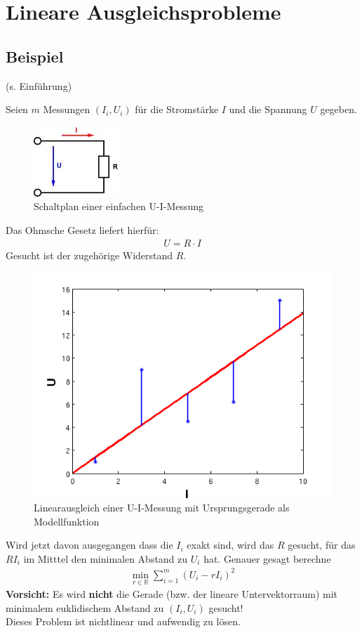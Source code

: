 \documentclass[ngerman,fontsize=11pt, paper=a4, parskip=half, titlepage=true, toc=bib]{scrbook}
\newcommand{\R}{\mathds{R}}
\newcommand{\sectione}[1]{\section{#1} \setcounter{equation}{0}}
\begin{document}
		
	\sectione{Lineare Ausgleichsprobleme} 
	
	\subsection{Beispiel}
	(s. Einführung)
	
	Seien $m$ Messungen $(I_i, U_i)$ für die Stromstärke $I$ und die Spannung $U$ gegeben. \\
	
		  \begin{figure}
		  	\parbox{\linewidth}{
		  		\centering
		  		\includegraphics{images/ohmsche.jpeg}
		  	}
		  	\caption{Schaltplan einer einfachen U-I-Messung}
		  \end{figure}
		  
		
	Das Ohmsche Gesetz liefert hierfür:
	\begin{gather*}
		U=R\cdot I
	\end{gather*}
	Gesucht ist der zugehörige Widerstand $R$.\\
	
			  \begin{figure}
			  	\parbox{\linewidth}{
			  		\centering
			  		\includegraphics[width=0.5\linewidth]{images/linausgl2.png}
			  	}
			  	\caption{Linearausgleich einer U-I-Messung mit Ursprungsgerade als Modellfunktion}
			  \end{figure}
	
	
	Wird jetzt davon ausgegangen dass die $I_i$ exakt sind, wird das $R$ gesucht, 
	für das $RI_i$ im Mitttel den minimalen Abstand zu $U_i$ hat.
	Genauer gesagt berechne
	\begin{gather*}
		\min_{r\in\R} \sum_{i=1}^{m}(U_i-rI_i)^2
	\end{gather*}
	\textbf{Vorsicht: } Es wird \textbf{nicht} die Gerade (bzw. der lineare Untervektorraum) mit 
	minimalem euklidischem Abstand zu $(I_i,U_i)$ gesucht! \\
	Dieses Problem ist nichtlinear und aufwendig zu lösen.\\
	
\end{document}
